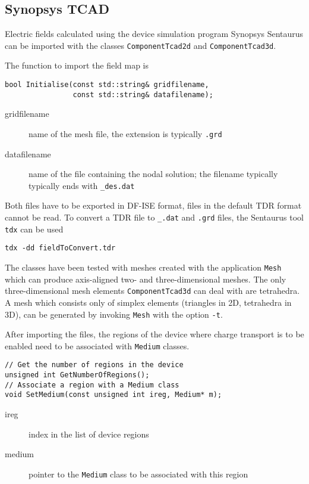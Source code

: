 \subsection{Synopsys TCAD}

Electric fields calculated using the device simulation program 
Synopsys Sentaurus \cite{Synopsys} can be imported with the classes 
\texttt{ComponentTcad2d} and \texttt{ComponentTcad3d}.

The function to import the field map is 
\begin{lstlisting}
bool Initialise(const std::string& gridfilename,
                const std::string& datafilename);
\end{lstlisting}
\begin{description}
  \item[gridfilename]
  name of the mesh file, the extension is typically \texttt{.grd}
  \item[datafilename]
  name of the file containing the nodal solution;
  the filename typically typically ends with \texttt{\_des.dat}
\end{description}

Both files have to be exported in DF-ISE format, 
files in the default TDR format cannot be read.
To convert a TDR file to \texttt{\_.dat} and \texttt{.grd} files, the
Sentaurus tool \texttt{tdx} can be used
\begin{lstlisting}
tdx -dd fieldToConvert.tdr
\end{lstlisting}

The classes have been tested with meshes created with the application 
\texttt{Mesh} which can produce axis-aligned 
two- and three-dimensional meshes.
The only three-dimensional mesh elements \texttt{ComponentTcad3d} 
can deal with are tetrahedra. 
A mesh which consists only of simplex elements 
(triangles in 2D, tetrahedra in 3D), 
can be generated by invoking \texttt{Mesh} with the option \texttt{-t}.

After importing the files, 
the regions of the device where charge transport is to be enabled 
need to be associated with \texttt{Medium} classes. 
\begin{lstlisting}
// Get the number of regions in the device
unsigned int GetNumberOfRegions();
// Associate a region with a Medium class
void SetMedium(const unsigned int ireg, Medium* m);
\end{lstlisting}
\begin{description}
  \item[ireg]
  index in the list of device regions
  \item[medium]
  pointer to the \texttt{Medium} class to be associated with this region
\end{description}

